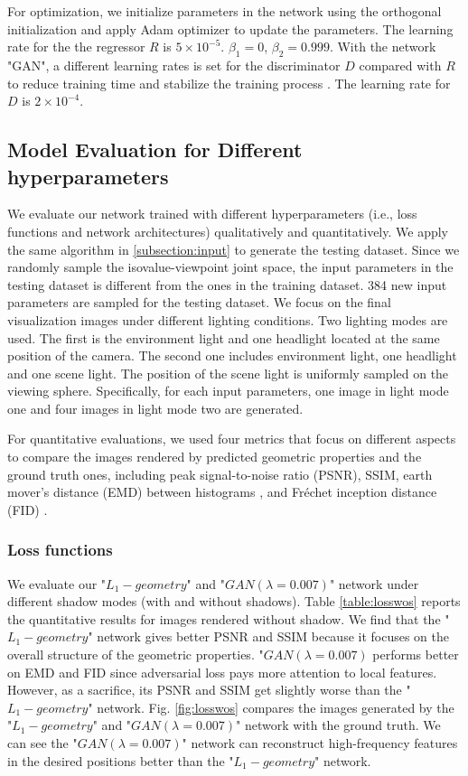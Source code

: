 \documentclass[journal]{vgtc}                %
\begin{document}
For optimization, we initialize parameters in the network using the orthogonal
initialization \cite{saxe2013exact} and apply Adam optimizer \cite{kingma2014adam} to update the parameters. The learning rate for the the regressor $R$ is $5 \times 10^{-5}$. $\beta_1 = 0$, $\beta_2 = 0.999$. With the network "GAN", a different learning rates is set for the discriminator $D$ compared with $R$ to reduce training time and stabilize the training process \cite{roth2017stabilizing}. The learning rate for $D$ is $2 \times 10^{-4}$. 

\subsection{Model Evaluation for Different hyperparameters }
We evaluate our network trained with different hyperparameters (i.e., loss functions and network architectures) qualitatively and quantitatively. We apply the same algorithm in \ref{subsection:input} to generate the testing dataset. Since we randomly sample the isovalue-viewpoint joint space, the input parameters in the testing dataset is different from the ones in the training dataset. 384 new input parameters are sampled for the testing dataset. We focus on the final visualization images under different lighting conditions. Two lighting modes are used. The first is the environment light and one headlight located at the same position of the camera. The second one includes environment light, one headlight and one scene light. The position of the scene light is uniformly sampled on the viewing sphere. Specifically, for each input parameters, one image  in light mode one and four images in light mode two are generated.   

For quantitative evaluations, we used four metrics that focus on different aspects to compare the images rendered by predicted geometric properties and the ground truth ones, including peak signal-to-noise ratio (PSNR), SSIM, earth mover's distance (EMD) between histograms \cite{berger2018generative}, and Fréchet
inception distance (FID) \cite{heusel2017gans}. 

\subsubsection{Loss functions}

We evaluate our "$L_1-geometry$" and "$GAN(\lambda=0.007)$" network under different shadow modes (with and without shadows). Table \ref{table:losswos} reports the quantitative results for images rendered without shadow. We find that the "$L_1-geometry$" network gives better PSNR and SSIM because it focuses on the overall structure of the geometric properties. "$GAN(\lambda=0.007)$ performs better on EMD and FID since adversarial loss pays more attention to local features. However, as a sacrifice, its PSNR and SSIM get slightly worse than the "$L_1-geometry$" network. Fig. \ref{fig:losswos} compares the images generated by the "$L_1-geometry$" and "$GAN(\lambda=0.007)$" network with the ground truth. We can see the "$GAN(\lambda=0.007)$" network can reconstruct high-frequency features in the desired positions better than the "$L_1-geometry$" network.
\end{document}

